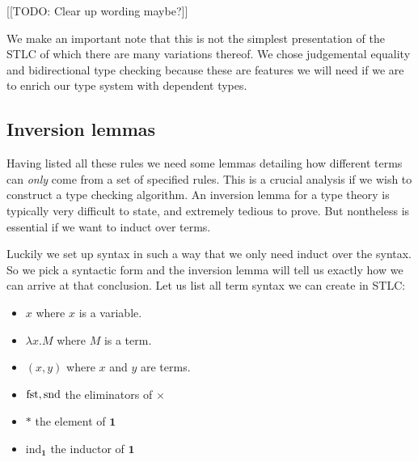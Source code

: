[[TODO: Clear up wording maybe?]]
\begin{remark}
    We make an important note that this is not the simplest presentation of the STLC of which there are many variations thereof. We chose judgemental equality and bidirectional type checking because these are features we will need if we are to enrich our type system with dependent types.
\end{remark}

\subsection{Inversion lemmas}
Having listed all these rules we need some lemmas detailing how different terms can \emph{only} come from a set of specified rules. This is a crucial analysis if we wish to construct a type checking algorithm. An inversion lemma for a type theory is typically very difficult to state, and extremely tedious to prove. But nontheless is essential if we want to induct over terms.

Luckily we set up syntax in such a way that we only need induct over the syntax. So we pick a syntactic form and the inversion lemma will tell us exactly how we can arrive at that conclusion. Let us list all term syntax we can create in STLC:

\begin{itemize}
    \item $x$ where $x$ is a variable.
    \item $\lambda x . M$ where $M$ is a term.
    \item $(x, y)$ where $x$ and $y$ are terms.
    \item $\mathrm{fst}, \mathrm{snd}$ the eliminators of $\times$
    \item $*$ the element of $\mathbf{1}$
    \item $\mathrm{ind}_{\mathbf{1}}$ the inductor of $\mathbf{1}$
\end{itemize}


\begin{lemma}
    
\end{lemma}

